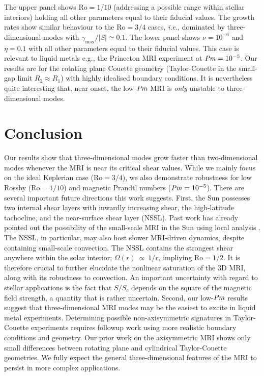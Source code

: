 \documentclass[openacc]{rsproca_new}%
\newcommand{\SSC}{S/S_{c}}
\newcommand{\Prm}{\mbox{\textit{Pm}}}
\newcommand{\Ro}{\mathrm{Ro}}
\begin{document}
The upper panel shows $\Ro=1/10$ (addressing a possible range within stellar interiors) holding all other parameters equal to their fiducial values.
The growth rates show similar behaviour to the $\Ro=3/4$ cases, \textit{i.e.}, dominated by three-dimensional modes with $\gamma_{\max}/|S|\simeq0.1$.
The lower panel shows $\nu=10^{-6}$ and $\eta=0.1$ with all other parameters equal to their fiducial values. 
This case is relevant to liquid metals e.g., the Princeton MRI experiment \cite{2002JFM...462..365G}
at $\Prm=10^{-5}$. 
Our results are for the rotating plane Couette geometry (Taylor-Couette in the small-gap limit $R_{2}\approx{R}_{1}$) with highly idealised boundary conditions.
It is nevertheless quite interesting that, near onset, the low-$\Prm$ MRI is \emph{only} unstable to three-dimensional modes.

\section{Conclusion}
\label{sec:conclusion}

Our results show that three-dimensional modes grow faster than two-dimensional modes whenever the MRI is near its critical shear values.
While we mainly focus on the ideal Keplerian case ($\Ro=3/4$), we also demonstrate robustness for low Rossby ($\Ro=1/10$) and magnetic Prandtl numbers ($\Prm=10^{-5}$).
There are several important future directions this work suggests.
First, the Sun possesses two internal shear layers with inwardly increasing shear, the high-latitude tachocline, and the near-surface shear layer (NSSL). 
Past work has already pointed out the possibility of the small-scale MRI in the Sun using local analysis \cite{2007ApJ...667L.207P,2011MNRAS.411L..26M,2014ApJ...787...21K}.
The NSSL, in particular, may also host slower MRI-driven dynamics, despite containing small-scale convection.
The NSSL contains the strongest shear anywhere within the solar interior;  $\Omega(r) \ \propto \ 1/r$, impliying $\Ro = 1/2$.
It is therefore crucial to further elucidate the nonlinear saturation of the 3D MRI, along with its robustness to convection.
An important uncertainty with regard to stellar applications is the fact that $\SSC$ depends on the square of the magnetic field strength, a quantity that is rather uncertain.
Second, our low-$\Prm$ results suggest that three-dimensional MRI modes may be the easiest to excite in liquid metal experiments.
Determining possible non-axisymmetric signatures in Taylor-Couette experiments requires followup work using more realistic boundary conditions and geometry. 
Our prior work on the axisymmetric MRI \cite{2017ApJ...841....1C,2017ApJ...841....2C} shows only small differences between rotating plane and cylindrical Taylor-Couette geometries. 
We fully expect the general three-dimensional features of the MRI to persist in more complex applications. 
\end{document}
